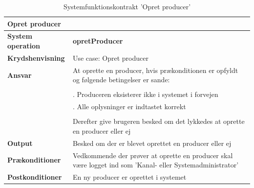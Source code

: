 \begin{table}[H]
    \begin{tabularx}{\textwidth}{|p{4cm}|X|}
        \hline
        \multicolumn{2}{|X|}{\textbf{Opret producer}}\\
        \hline
        \textbf{System operation}       & \textbf{opretProducer} \\ \hline
        \textbf{Krydshenvisning}        & Use case: Opret producer \\ \hline\textbf{}
        \textbf{Ansvar}                 & At oprette en producer, hvis prækonditionen er opfyldt og følgende betingelser er sande: \\ 
                                        & \\ 
                                        & \quad 1. Produceren eksisterer ikke i systemet i forvejen \\
                                        & \quad 2. Alle oplysninger er indtastet korrekt \\
                                        & \\
                                        & Derefter give brugeren besked om det lykkedes at oprette en producer eller ej \\\hline
        \textbf{Output}                 & Besked om der er blevet oprettet en producer eller ej \\ \hline
        \textbf{Prækonditioner}         & Vedkommende der prøver at oprette en producer skal være logget ind som 'Kanal- eller                                                  Systemadministrator' \\ \hline
        \textbf{Postkonditioner}        & En ny producer er oprettet i systemet \\ \hline
    \end{tabularx}
    \caption{Systemfunktionskontrakt 'Opret producer'}
    \label{tab:kontrakter_opret_producer}
\end{table}


